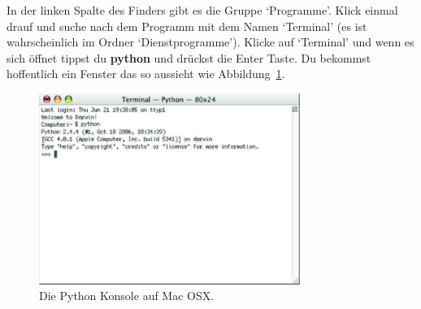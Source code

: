 \begin{MAC}
In der linken Spalte des Finders gibt es die Gruppe `Programme'. Klick einmal drauf und suche nach dem Programm mit dem Namen `Terminal' (es ist wahrscheinlich im Ordner `Dienstprogramme').
Klicke auf `Terminal' und wenn es sich öffnet tippst du \textbf{python} und drückst die Enter Taste. Du bekommst hoffentlich ein Fenster das so aussieht wie Abbildung~\ref{fig3}.


\begin{figure}
\begin{center}
\includegraphics[width=85mm]{images/figure3}
\end{center}
\caption{Die Python Konsole auf Mac OSX.}\label{fig3}
\end{figure}
\end{MAC}

